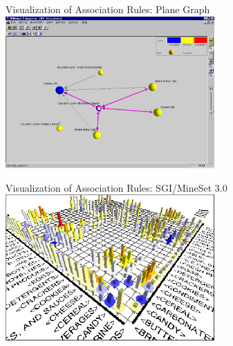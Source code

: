 \begin{frame}{Visualization of Association Rules: Plane Graph}
	\includegraphics[width=0.6\textwidth]{img/assoc_rules2.jpg}
\end{frame}

\begin{frame}{Visualization of Association Rules: SGI/MineSet 3.0}
	\includegraphics[width=0.6\textwidth]{img/assoc_rules3.png}
\end{frame}